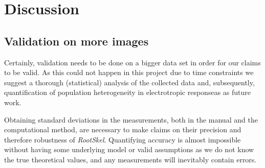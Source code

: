 
\chapter{Discussion} %

\label{discussion} %

%





\section{Validation on more images}


Certainly, validation needs to be done on a bigger data set in order for our claims to be valid.
As this could not happen in this project due to time constraints we suggest a thorough (statistical) analysis of the collected data and, subsequently, quantification of population heterogeneity in electrotropic responseas as future work.

Obtaining standard deviations in the measurements, both in the manual and the computational method, are necessary to make claims on their precision and therefore robustness of \textit{RootSkel}. Quantifying accuracy is almost impossible without having some underlying model or valid assumptions as we do not know the true theoretical values, and any measurements will inevitably contain errors. 


